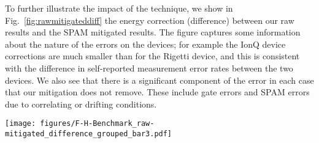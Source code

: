 \documentclass[
prx,
superscriptaddress,
twocolumn,
longbibliography
]{revtex4-1}
\begin{document}


To further illustrate the impact of the technique, we show in Fig.~\ref{fig:rawmitigateddiff} the energy correction (difference) between our raw results and the SPAM mitigated  results. The figure captures some information about the nature of the errors on the devices; for example the IonQ device corrections are much smaller than for the Rigetti device, and this is consistent with the difference in self-reported measurement error rates between the two devices.  We also see that there is a significant component of the error in each case that our mitigation does not remove.  These include gate errors and SPAM errors due to correlating or drifting conditions.
 
\begin{figure*}
    \centering
    \texttt{[image: figures/F-H-Benchmark\_raw-mitigated\_difference\_grouped\_bar3.pdf]}
    \caption{Energy differences between each device's raw results and its SPAM mitigated results. This difference characterizes the magnitude of errors which arise due to uncorrelated SPAM errors. Large, positive differences indicate that the mitigation results in a largely improved energy measurement after mitigation. Not all devices are present at each chain length due to varying physical system size.}
    \label{fig:rawmitigateddiff}
\end{figure*}
\end{document}
